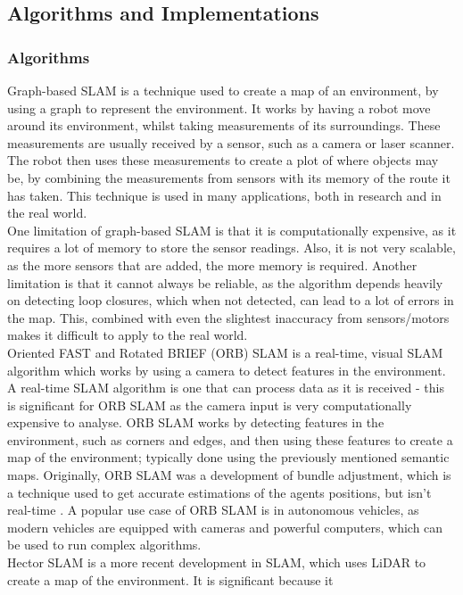 \documentclass[12pt]{article}
\begin{document}
\subsection{Algorithms and Implementations} %
\subsubsection{Algorithms}
Graph-based SLAM is a technique used to create a map of an environment, by using a graph to represent the environment. It
works by having a robot move around its environment, whilst taking measurements of its surroundings. These measurements
are usually received by a sensor, such as a camera or laser scanner. The robot then uses these measurements to create a
plot of where objects may be, by combining the measurements from sensors with its memory of the route it has taken. This
technique is used in many applications, both in research and in the real world.\\
One limitation of graph-based SLAM is that it is computationally expensive, as it requires a lot of memory to store the
sensor readings. Also, it is not very scalable, as the more sensors that are added, the more memory is required. Another
limitation is that it cannot always be reliable, as the algorithm depends heavily on detecting loop closures, which when
not detected, can lead to a lot of errors in the map. This, combined with even the slightest inaccuracy from sensors/motors
makes it difficult to apply to the real world.\\
Oriented FAST and Rotated BRIEF (ORB) SLAM is a real-time, visual SLAM algorithm which works by using a camera to detect features
in the environment. A real-time SLAM algorithm is one that can process data as it is received - this is significant for ORB SLAM
as the camera input is very computationally expensive to analyse. ORB SLAM works by detecting features in the environment, such
as corners and edges, and then using these features to create a map of the environment; typically done using the previously
mentioned semantic maps. Originally, ORB SLAM was a development of bundle adjustment, which is a technique used to get accurate
estimations of the agents positions, but isn't real-time \cite{ORB_SLAM}. A popular use case of ORB SLAM is in autonomous vehicles,
as modern vehicles are equipped with cameras and powerful computers, which can be used to run complex algorithms.\\
Hector SLAM is a more recent development in SLAM, which uses LiDAR to create a map of the environment. It is significant because it
\end{document}
